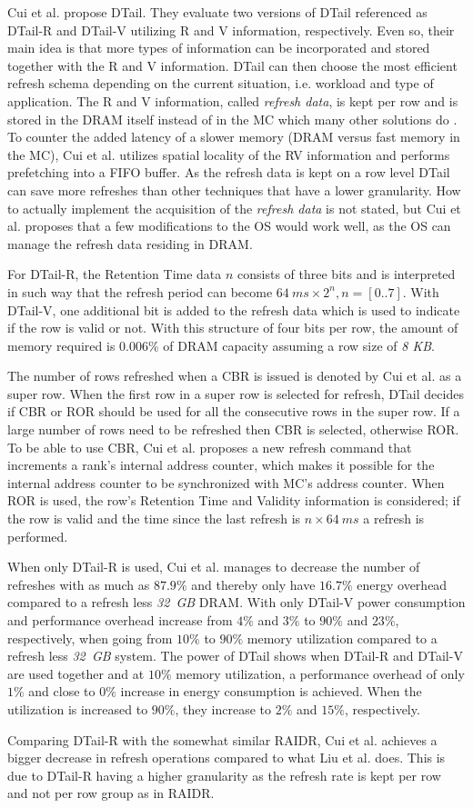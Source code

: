 Cui et al. \cite{dtail} propose DTail. They evaluate two versions of DTail referenced as DTail-R and DTail-V utilizing R and V information, respectively. Even so, their main idea is that more types of  information can be incorporated and stored together with the R and V information. DTail can then choose the most efficient refresh schema depending on the current situation, i.e. workload and type of application. The R and V information, called \textit{refresh data}, is kept per row and is stored in the DRAM itself instead of in the MC which many other solutions do \cite{raidr}\cite{smartrefresh}\cite{refrint}. To counter the added latency of a slower memory (DRAM versus fast memory in the MC), Cui et al. utilizes spatial locality of the RV information and performs prefetching into a FIFO buffer. As the refresh data is kept on a row level DTail can save more refreshes than other techniques that have a lower granularity. How to actually implement the acquisition of the \textit{refresh data} is not stated, but Cui et al. proposes that a few modifications to the OS would work well, as the OS can manage the refresh data residing in DRAM.

For DTail-R, the Retention Time data $n$ consists of three bits and is interpreted in such way that the refresh period can become \(64\:ms \times 2^n, n = [0..7]\). With DTail-V, one additional bit is added to the refresh data which is used to indicate if the row is valid or not. With this structure of four bits per row, the amount of memory required is $0.006\%$ of DRAM capacity assuming a row size of \textit{8 KB}.

The number of rows refreshed when a CBR is issued is denoted by Cui et al. as a super row. When the first row in a super row is selected for refresh, DTail decides if CBR or ROR should be used for all the consecutive rows in the super row. If a large number of rows need to be refreshed then CBR is selected, otherwise ROR. To be able to use CBR, Cui et al. proposes a new refresh command that increments a rank's internal address counter, which makes it possible for the internal address counter to be synchronized with MC's address counter. When ROR is used, the row's Retention Time and Validity information is considered; if the row is valid and the time since the last refresh is $n \times 64\:ms$ a refresh is performed. 

When only DTail-R is used, Cui et al. manages to decrease the number of refreshes with as much as $87.9\%$ and thereby only have $16.7\%$ energy overhead compared to a refresh less \textit{32~GB} DRAM. With only DTail-V power consumption and performance overhead increase from $4\%$ and $3\%$ to $90\%$ and $23\%$, respectively, when going from $10\%$ to $90\%$ memory utilization compared to a refresh less \textit{32~GB} system. The power of DTail shows when DTail-R and DTail-V are used together and at $10\%$ memory utilization, a performance overhead of only $1\%$ and close to $0\%$ increase in energy consumption is achieved. When the utilization is increased to $90\%$, they increase to $2\%$ and $15\%$, respectively.

Comparing DTail-R with the somewhat similar RAIDR, Cui et al. achieves a bigger decrease in refresh operations compared to what Liu et al. does. This is due to DTail-R having a higher granularity as the refresh rate is kept per row and not per row group as in RAIDR.